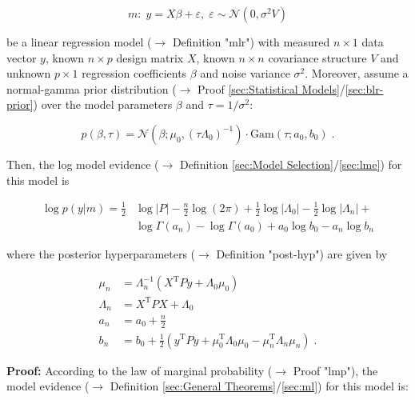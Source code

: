 \documentclass[a4paper,12pt]{book}
\begin{document}
\begin{equation} \label{eq:blr-lme-GLM}
m: \; y = X \beta + \varepsilon, \; \varepsilon \sim \mathcal{N}(0, \sigma^2 V)
\end{equation}

be a linear regression model ($\rightarrow$ Definition "mlr") with measured $n \times 1$ data vector $y$, known $n \times p$ design matrix $X$, known $n \times n$ covariance structure $V$ and unknown $p \times 1$ regression coefficients $\beta$ and noise variance $\sigma^2$.  Moreover, assume a normal-gamma prior distribution ($\rightarrow$ Proof \ref{sec:Statistical Models}/\ref{sec:blr-prior}) over the model parameters $\beta$ and $\tau = 1/\sigma^2$:

\begin{equation} \label{eq:blr-lme-GLM-NG-prior}
p(\beta,\tau) = \mathcal{N}(\beta; \mu_0, (\tau \Lambda_0)^{-1}) \cdot \mathrm{Gam}(\tau; a_0, b_0) \; .
\end{equation}

Then, the log model evidence ($\rightarrow$ Definition \ref{sec:Model Selection}/\ref{sec:lme}) for this model is

\begin{equation} \label{eq:blr-lme-GLM-NG-LME}
\begin{split}
\log p(y|m) = \frac{1}{2} & \log |P| - \frac{n}{2} \log (2 \pi)  + \frac{1}{2} \log |\Lambda_0| - \frac{1}{2} \log |\Lambda_n| + \\
& \log \Gamma(a_n) - \log \Gamma(a_0) + a_0 \log b_0 - a_n \log b_n
\end{split}
\end{equation}

where the posterior hyperparameters ($\rightarrow$ Definition "post-hyp") are given by

\begin{equation} \label{eq:blr-lme-GLM-NG-post-par}
\begin{split}
\mu_n &= \Lambda_n^{-1} (X^\mathrm{T} P y + \Lambda_0 \mu_0) \\
\Lambda_n &= X^\mathrm{T} P X + \Lambda_0 \\
a_n &= a_0 + \frac{n}{2} \\
b_n &= b_0 + \frac{1}{2} (y^\mathrm{T} P y + \mu_0^\mathrm{T} \Lambda_0 \mu_0 - \mu_n^\mathrm{T} \Lambda_n \mu_n) \; .
\end{split}
\end{equation}


\vspace{1em}
\textbf{Proof:} According to the law of marginal probability ($\rightarrow$ Proof "lmp"), the model evidence ($\rightarrow$ Definition \ref{sec:General Theorems}/\ref{sec:ml}) for this model is:
\end{document}

